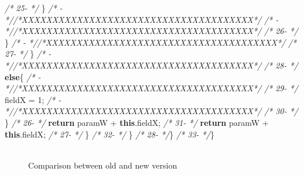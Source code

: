 \documentclass[
]{article}
\newenvironment{Shaded}{\begin{snugshade}}{\end{snugshade}}
\newcommand{\CommentTok}[1]{\textcolor[rgb]{0.56,0.35,0.01}{\textit{#1}}}
\newcommand{\DecValTok}[1]{\textcolor[rgb]{0.00,0.00,0.81}{#1}}
\newcommand{\FunctionTok}[1]{\textcolor[rgb]{0.00,0.00,0.00}{#1}}
\newcommand{\KeywordTok}[1]{\textcolor[rgb]{0.13,0.29,0.53}{\textbf{#1}}}
\newcommand{\NormalTok}[1]{#1}
\begin{document}
\begin{landscape}
\begin{Shaded}
\begin{Highlighting}[]
\CommentTok{/* 25-                 */}\NormalTok{        \}                                                      }\CommentTok{/*   -                 *//*XXXXXXXXXXXXXXXXXXXXXXXXXXXXXXXXXXXXXX*/}                     
\CommentTok{/*   -                 *//*XXXXXXXXXXXXXXXXXXXXXXXXXXXXXXXXXXXXXX*/}                     \CommentTok{/* 26-                 */}\NormalTok{            \}                                                  }
\CommentTok{/*   -                 *//*XXXXXXXXXXXXXXXXXXXXXXXXXXXXXXXXXXXXXX*/}                     \CommentTok{/* 27-                 */}\NormalTok{       \}                                                                 }
\CommentTok{/*   -                 *//*XXXXXXXXXXXXXXXXXXXXXXXXXXXXXXXXXXXXXX*/}                     \CommentTok{/* 28-                 */}       \KeywordTok{else}\NormalTok{\{                                                      }
\CommentTok{/*   -                 *//*XXXXXXXXXXXXXXXXXXXXXXXXXXXXXXXXXXXXXX*/}                     \CommentTok{/* 29-                 */}\NormalTok{           fieldX = }\DecValTok{1}\NormalTok{;                                                }
\CommentTok{/*   -                 *//*XXXXXXXXXXXXXXXXXXXXXXXXXXXXXXXXXXXXXX*/}                     \CommentTok{/* 30-                 */}\NormalTok{       \}                                                              }
\CommentTok{/* 26-                 */}        \KeywordTok{return}\NormalTok{ paramW + }\KeywordTok{this}\NormalTok{.}\FunctionTok{fieldX}\NormalTok{;                           }\CommentTok{/* 31-                 */}        \KeywordTok{return}\NormalTok{ paramW + }\KeywordTok{this}\NormalTok{.}\FunctionTok{fieldX}\NormalTok{;                           }
\CommentTok{/* 27-                 */}\NormalTok{     \}                                                         }\CommentTok{/* 32-                 */}\NormalTok{     \}                                                         }
\CommentTok{/* 28-                 */}\NormalTok{\}                                                              }\CommentTok{/* 33-                 */}\NormalTok{\}                                                              }
\end{Highlighting}
\end{Shaded}

\normalsize

\begin{figure}
\centering
\includegraphics{figures/fake.png}
\caption{Comparison between old and new version
\label{comparison_nested_in_other_if}}
\end{figure}

\end{landscape}
\end{document}
